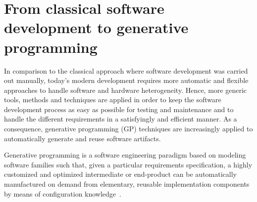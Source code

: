 






\section{From classical software development to generative programming}
\label{sec:FROM} 
In comparison to the classical approach where software development was carried out manually, today’s modern development requires more automatic and flexible approaches to handle software and hardware heterogeneity.
Hence, more generic tools, methods and techniques are applied in order to keep the software development process as easy as possible for testing and maintenance and to handle the different requirements in a satisfyingly and efficient manner.
As a consequence, generative programming (GP) techniques are increasingly applied to automatically generate and reuse software artifacts.
\begin{mydef}
		Generative programming is a software engineering paradigm based on modeling software families such that, given a particular requirements specification, a highly customized and optimized intermediate or end-product can be automatically manufactured on demand from elementary, reusable implementation components by means of configuration knowledge~\cite{Czarnecki:2000:GPM:345203}.
\end{mydef}

